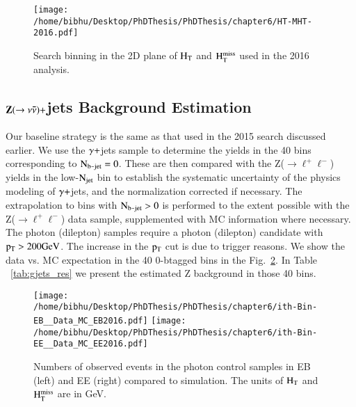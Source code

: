 \begin{figure}[h]
\begin{center}
\texttt{[image: /home/bibhu/Desktop/PhDThesis/PhDThesis/chapter6/HT-MHT-2016.pdf]}

\caption{\label{fig:HT-MHT-2016} Search binning in the 2D plane of $\rm H_{T}$ and $\rm H_{T}^{miss}$ used in the 2016 analysis.}
\end{center}
\end{figure}



\subsection{\bf $\bf Z(\rightarrow \nu \bar{\nu})+$jets Background Estimation}


Our baseline strategy is the same as that used in the 2015 search discussed earlier.
We use the $\rm \gamma+$jets sample to determine the
yields in the 40 bins corresponding to $\rm N_{b\texttt{-}jet}=0$.  These are
 then compared with the Z($\rightarrow \ell^{+} \ell^{-}$) yields in the low-$\rm N_{jet}$
bin to establish the systematic uncertainty of the physics modeling of
$\rm \gamma+$jets, and the normalization corrected if necessary.  
The extrapolation to bins with $\rm N_{b\texttt{-}jet}>0$ is performed to
the extent possible with the Z($\rightarrow \ell^{+} \ell^{-}$) data sample, supplemented with MC
information where necessary.  The photon (dilepton) samples require a
photon (dilepton) candidate with $\rm p_{T}>200 GeV$. The increase in the $\rm p_{T}$ cut is due to trigger reasons. We show the data vs. MC expectation in the 40  0-btagged bins in the Fig.~\ref{fig:nobs2016}. In Table ~\ref{tab:gjets_res} we present the estimated Z background in those 40 bins.


\begin{figure}[h]
\begin{center}
\texttt{[image: /home/bibhu/Desktop/PhDThesis/PhDThesis/chapter6/ith-Bin-EB\_\_Data\_MC\_EB2016.pdf]} %
\texttt{[image: /home/bibhu/Desktop/PhDThesis/PhDThesis/chapter6/ith-Bin-EE\_\_Data\_MC\_EE2016.pdf]} %
\caption{Numbers of observed events in the photon control samples in EB (left) and EE (right) compared to simulation. The units of $\rm H_{T}$ and $\rm H_{T}^{miss}$ are in GeV.}
\label{fig:nobs2016}
\end{center}
\end{figure}




